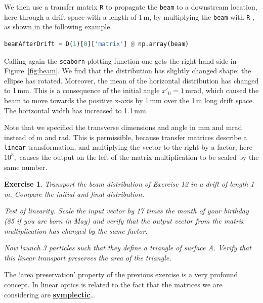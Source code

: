 \documentclass{article}
\newtheorem{exercise}{Exercise}
\newenvironment{block}[1]{\tcolorbox[beamer,%
    noparskip,breakable,
    colback=backcolour,colframe=blue,%
    colbacklower=backcolour!75!backcolour,%
    title=#1]
    }%
    {\endtcolorbox}
\begin{document}
\par
We then use a transfer matrix {\tt R} to propagate the {\tt beam} to a downstream
location, here through a drift space with a length of 1\,m, by multiplying the {\tt beam}
with {\tt R} , as shown in the following example.
\begin{lstlisting}[language=Python]
beamAfterDrift = D(1)[0]['matrix'] @ np.array(beam)
\end{lstlisting}
Calling again  the {\tt seaborn} plotting function one gets the  right-hand side in 
Figure~\ref{fig:beam}. We find that the distribution has slightly changed shape:
the ellipse has rotated. Moreover, the mean of the horizontal distribution has 
changed to 1\,mm. This is a consequence of the initial angle $x'_0=1\,$mrad, which
caused the beam to move towards the positive x-axis by 1\,mm over the 1\,m long 
drift space. The horizontal width has increased to 1.1\,mm.
\par
Note that we specified the transverse dimensions and angle in mm and mrad instead
of m and rad. This is permissible, because transfer matrices describe a {\tt linear}
transformation, and multiplying the vector to the right by a factor, here $10^3,$
causes the output on the left of the matrix multiplication to be scaled by the same 
number.
\begin{exercise}
Transport the beam distribution of Exercise 12 in a drift of length 1 m. Compare the initial and final distribution.

Test of linearity.  Scale the input vector by 17 times the month of your birthday (85 if you are born in May) and verify that the output vector from the matrix multiplication has changed by the same factor.

Now launch 3 particles such that they define a triangle of surface A. Verify that this linear transport preserves the area of the triangle. 
\end{exercise}
\begin{block}{Nota Bene}
The `area preservation' property of the previous exercise is a very profound concept. In linear optics is related to the fact that the matrices we are considering are \href{https://en.wikipedia.org/wiki/Symplectic_matrix}{\textbf{symplectic}}\dots 
\end{block}
\end{document}
